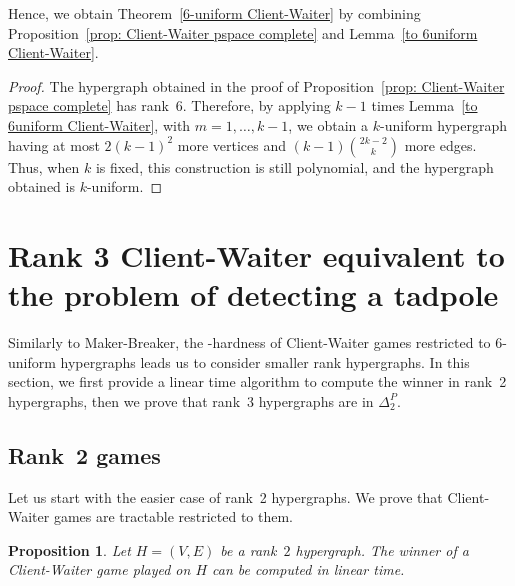 \documentclass{article}
\newcommand{\hyp}{H}
\newcommand{\WS}{E}
\newcommand{\som}{V}
\newcommand{\hxf}{\hyp = (\som, \WS)}
\newcommand{\hedges}{edges\xspace}
\newtheorem{proposition}[theorem]{Proposition}
\begin{document}
Hence, we obtain Theorem~\ref{6-uniform Client-Waiter} by combining Proposition~\ref{prop: Client-Waiter pspace complete} and Lemma~\ref{to 6uniform Client-Waiter}.

\begin{proof}
    The hypergraph obtained in the proof of Proposition~\ref{prop: Client-Waiter pspace complete} has rank~6. Therefore, by applying \(k-1\) times Lemma~\ref{to 6uniform Client-Waiter}, with $m = 1, \ldots, k-1$, we obtain a \(k\)-uniform hypergraph having at most $2(k-1)^2$ more vertices and $(k-1)\binom{2k-2}{k}$ more \hedges. Thus, when \(k\) is fixed, this construction is still polynomial, and the hypergraph obtained is $k$-uniform. 
\end{proof}









\section{Rank 3 Client-Waiter equivalent to the problem of detecting a tadpole} \label{sec: rank3 client-waiter}

Similarly to Maker-Breaker, the \PSPACE-hardness of Client-Waiter games restricted to $6$-uniform hypergraphs leads us to consider smaller rank hypergraphs. In this section, we first provide a linear time algorithm to compute the winner in rank~2 hypergraphs, then we prove that rank~3 hypergraphs are in $\Delta_2^P$.

\subsection{Rank~2 games}

Let us start with the easier case of rank~2 hypergraphs. We prove that Client-Waiter games are tractable restricted to them.

\begin{proposition}\label{prop: rank 2 Client-Waiter}
        Let $\hxf$ be a rank~$2$ hypergraph. The winner of a Client-Waiter game played on $\hyp$ can be computed in linear time.
\end{proposition}
\end{document}
